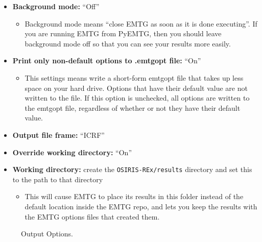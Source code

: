 \documentclass[11pt]{article}
\begin{document}
\begin{itemize}
	\item \textbf{Background mode:} ``Off''
	\begin{itemize}
		\item Background mode means ``close \ac{EMTG} as soon as it is done executing''. If you are running \ac{EMTG} from PyEMTG, then you should leave background mode off so that you can see your results more easily.
	\end{itemize}
	\item \textbf{Print only non-default options to .emtgopt file:} ``On''
	\begin{itemize}
		\item This settings means write a short-form emtgopt file that takes up less space on your hard drive. Options that have their default value are not written to the file. If this option is unchecked, all options are written to the emtgopt file, regardless of whether or not they have their default value.
	\end{itemize}
	\item \textbf{Output file frame:} ``\acs{ICRF}''
	\item \textbf{Override working directory:} ``On''
	\item \textbf{Working directory:} create the \texttt{OSIRIS-REx/results} directory and set this to the path to that directory
	\begin{itemize}
		\item This will cause \ac{EMTG} to place its results in this folder instead of the default location inside the \ac{EMTG} repo, and lets you keep the results with the \ac{EMTG} options files that created them.
	\end{itemize}
\end{itemize}

\begin{figure}[H]
	\centering
	\caption{\label{fig:output_options}Output Options.}
\end{figure}
\end{document}
